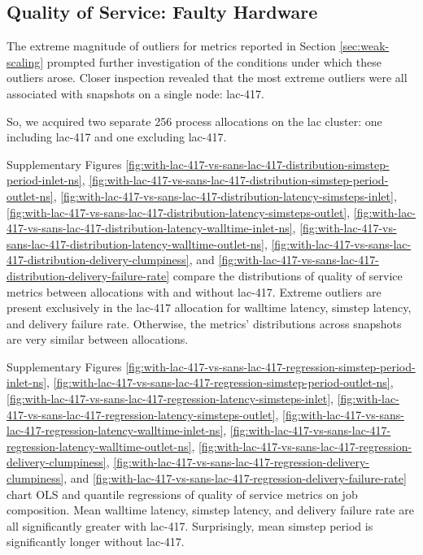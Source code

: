 \subsection{Quality of Service: Faulty Hardware}
\label{sec:with-lac-417-vs-sans-lac-417}



The extreme magnitude of outliers for metrics reported in Section \ref{sec:weak-scaling} prompted further investigation of the conditions under which these outliers arose.
Closer inspection revealed that the most extreme outliers were all associated with snapshots on a single node: lac-417.

So, we acquired two separate 256 process allocations on the lac cluster: one including lac-417 and one excluding lac-417.

Supplementary Figures \ref{fig:with-lac-417-vs-sans-lac-417-distribution-simstep-period-inlet-ns}, \ref{fig:with-lac-417-vs-sans-lac-417-distribution-simstep-period-outlet-ns}, \ref{fig:with-lac-417-vs-sans-lac-417-distribution-latency-simsteps-inlet}, \ref{fig:with-lac-417-vs-sans-lac-417-distribution-latency-simsteps-outlet}, \ref{fig:with-lac-417-vs-sans-lac-417-distribution-latency-walltime-inlet-ns}, \ref{fig:with-lac-417-vs-sans-lac-417-distribution-latency-walltime-outlet-ns}, \ref{fig:with-lac-417-vs-sans-lac-417-distribution-delivery-clumpiness}, and \ref{fig:with-lac-417-vs-sans-lac-417-distribution-delivery-failure-rate} compare the distributions of quality of service metrics between allocations with and without lac-417.
Extreme outliers are present exclusively in the lac-417 allocation for walltime latency, simstep latency, and delivery failure rate.
Otherwise, the metrics' distributions across snapshots are very similar between allocations.

Supplementary Figures \ref{fig:with-lac-417-vs-sans-lac-417-regression-simstep-period-inlet-ns}, \ref{fig:with-lac-417-vs-sans-lac-417-regression-simstep-period-outlet-ns}, \ref{fig:with-lac-417-vs-sans-lac-417-regression-latency-simsteps-inlet}, \ref{fig:with-lac-417-vs-sans-lac-417-regression-latency-simsteps-outlet}, \ref{fig:with-lac-417-vs-sans-lac-417-regression-latency-walltime-inlet-ns}, \ref{fig:with-lac-417-vs-sans-lac-417-regression-latency-walltime-outlet-ns}, \ref{fig:with-lac-417-vs-sans-lac-417-regression-delivery-clumpiness}, \ref{fig:with-lac-417-vs-sans-lac-417-regression-delivery-clumpiness}, and
\ref{fig:with-lac-417-vs-sans-lac-417-regression-delivery-failure-rate} chart OLS and quantile regressions of quality of service metrics on job composition.
Mean walltime latency, simstep latency, and delivery failure rate are all significantly greater with lac-417.
Surprisingly, mean simstep period is significantly longer without lac-417.

